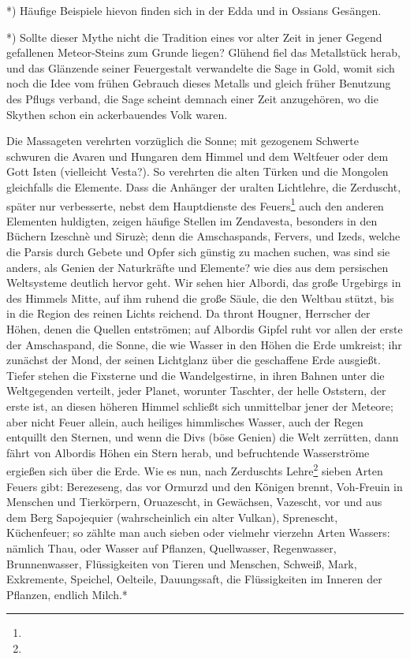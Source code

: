 \documentclass[a4paper, 11pt, oneside, polutonikogreek, german]{article}
\begin{document}
*) Häufige Beispiele hievon finden sich in der Edda und in Ossians Gesängen.

*) Sollte dieser Mythe nicht die Tradition eines vor alter Zeit in jener Gegend gefallenen Meteor-Steins zum Grunde liegen? Glühend fiel das Metallstück herab, und das Glänzende seiner Feuergestalt verwandelte die Sage in Gold, womit sich noch die Idee vom frühen Gebrauch dieses Metalls und gleich früher Benutzung des Pflugs verband, die Sage scheint demnach einer Zeit anzugehören, wo die Skythen schon ein ackerbauendes Volk waren.

Die Massageten verehrten vorzüglich die Sonne; mit gezogenem Schwerte schwuren die Avaren und Hungaren dem Himmel und dem Weltfeuer oder dem Gott Isten (vielleicht Vesta?). So verehrten die alten Türken und die Mongolen gleichfalls die Elemente. Dass die Anhänger der uralten Lichtlehre, die Zerduscht, später nur verbesserte, nebst dem Hauptdienste des Feuers\footnote{} auch den anderen Elementen huldigten, zeigen häufige Stellen im Zendavesta, besonders in den Büchern Izeschnè und Siruzè; denn die Amschaspands, Fervers, und Izeds, welche die Parsis durch Gebete und Opfer sich günstig zu machen suchen, was sind sie anders, als Genien der Naturkräfte und Elemente? wie dies aus dem persischen Weltsysteme deutlich hervor geht. Wir sehen hier Albordi, das große Urgebirgs in des Himmels Mitte, auf ihm ruhend die große Säule, die den Weltbau stützt, bis in die Region des reinen Lichts reichend. Da thront Hougner, Herrscher der Höhen, denen die Quellen entströmen; auf Albordis Gipfel ruht vor allen der erste der Amschaspand, die Sonne, die wie Wasser in den Höhen die Erde umkreist; ihr zunächst der Mond, der seinen Lichtglanz über die geschaffene Erde ausgießt. Tiefer stehen die Fixsterne und die Wandelgestirne, in ihren Bahnen unter die Weltgegenden verteilt, jeder Planet, worunter Taschter, der helle Oststern, der erste ist, an diesen höheren Himmel schließt sich unmittelbar jener der Meteore; aber nicht Feuer allein, auch heiliges himmlisches Wasser, auch der Regen entquillt den Sternen, und wenn die Divs (böse Genien) die Welt zerrütten, dann fährt von Albordis Höhen ein Stern herab, und befruchtende Wasserströme ergießen sich über die Erde. Wie es nun, nach Zerduschts Lehre\footnote{} sieben Arten Feuers gibt: Berezeseng, das vor Ormurzd und den Königen brennt, Voh-Freuin in Menschen und Tierkörpern, Oruazescht, in Gewächsen, Vazescht, vor und aus dem Berg Sapojequier (wahrscheinlich ein alter Vulkan), Sprenescht, Küchenfeuer; so zählte man auch sieben oder vielmehr vierzehn Arten Wassers: nämlich Thau, oder Wasser auf Pflanzen, Quellwasser, Regenwasser, Brunnenwasser, Flüssigkeiten von Tieren und Menschen, Schweiß, Mark, Exkremente, Speichel, Oelteile, Dauungssaft, die Flüssigkeiten im Inneren der Pflanzen, endlich Milch.*
\end{document}
